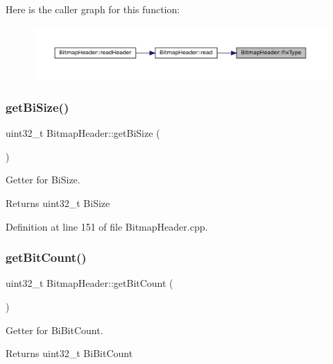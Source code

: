 Here is the caller graph for this function\+:
\nopagebreak
\begin{figure}[H]
\begin{center}
\leavevmode
\includegraphics[width=350pt]{classBitmapHeader_aa02e59db95074c6a96a44dac03cee77b_icgraph}
\end{center}
\end{figure}
\mbox{\label{classBitmapHeader_acce4b6292e2aaf5dbd4bc10687c4fb65}} 
\subsubsection{\texorpdfstring{getBiSize()}{getBiSize()}}
{\footnotesize\ttfamily uint32\+\_\+t Bitmap\+Header\+::get\+Bi\+Size (\begin{DoxyParamCaption}{ }\end{DoxyParamCaption})}



Getter for Bi\+Size. 

\begin{DoxyReturn}{Returns}
uint32\+\_\+t Bi\+Size 
\end{DoxyReturn}


Definition at line 151 of file Bitmap\+Header.\+cpp.

\mbox{\label{classBitmapHeader_a2660782990f1d9547e0aef501f666969}} 
\subsubsection{\texorpdfstring{getBitCount()}{getBitCount()}}
{\footnotesize\ttfamily uint32\+\_\+t Bitmap\+Header\+::get\+Bit\+Count (\begin{DoxyParamCaption}{ }\end{DoxyParamCaption})}



Getter for Bi\+Bit\+Count. 

\begin{DoxyReturn}{Returns}
uint32\+\_\+t Bi\+Bit\+Count 
\end{DoxyReturn}



